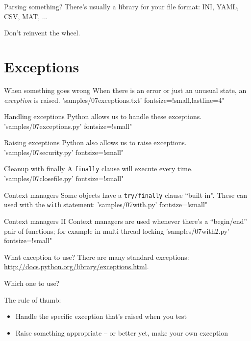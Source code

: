 \documentclass{pyslides}
\begin{document}
\begin{frame}[fragile]{Parsing something?}
There's usually a library for your file format: INI, YAML, CSV, MAT, ...

Don't reinvent the wheel.
\end{frame}

\section{Exceptions}

\begin{frame}[fragile]{When something goes wrong}
When there is an error or just an unusual state, an \emph{exception} is raised.
\bigskip
 'samples/07exceptions.txt' fontsize=!small,lastline=4"
\end{frame}

\begin{frame}[fragile]{Handling exceptions}
Python allows us to handle these exceptions.
\bigskip
 'samples/07exceptions.py' fontsize=!small"
\end{frame}

\begin{frame}[fragile]{Raising exceptions}
Python also allows us to raise exceptions.
\bigskip
 'samples/07security.py' fontsize=!small"
\end{frame}

\begin{frame}[fragile]{Cleanup with finally}
A \texttt{finally} clause will execute every time.
\bigskip
 'samples/07closefile.py' fontsize=!small"
\end{frame}

\begin{frame}[fragile]{Context managers}
Some objects have a \texttt{try/finally} clause “built in”. These can used with the \verb}with} statement:
\bigskip
 'samples/07with.py' fontsize=!small"
\end{frame}

\begin{frame}[fragile]{Context managers II}
Context managers are used whenever there's a “begin/end” pair of functions; for example in multi-thread locking
\bigskip
 'samples/07with2.py' fontsize=!small"
\end{frame}

\begin{frame}[fragile]{What exception to use?}
There are many standard exceptions: \href{http://docs.python.org/library/exceptions.html}{http://docs.python.org/library/exceptions.html}.

Which one to use?

\bigskip

The rule of thumb:
\begin{itemize}
\item Handle the specific exception that's raised when you test
\item Raise something appropriate – or better yet, make your own exception
\end{itemize}
\end{frame}
\end{document}
